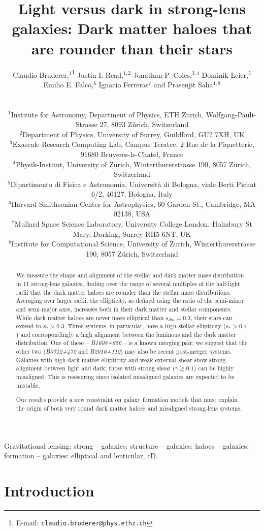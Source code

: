 \documentclass[useAMS,usenatbib]{mn2e}
\title[Light versus dark in strong-lens galaxies]{Light versus dark in strong-lens galaxies: Dark matter haloes that are rounder than their stars}
\author[Bruderer et al.]
{\parbox{\textwidth}{Claudio Bruderer,$^{1}$\thanks{E-mail: \texttt{claudio.bruderer@phys.ethz.ch}}
Justin I. Read,$^{1,2}$
Jonathan P. Coles,$^{3,4}$
Dominik Leier,$^{5}$
Emilio E. Falco,$^{6}$
Ignacio Ferreras$^{7}$ and
Prasenjit Saha$^{4,8}$}\vspace{0.4cm}\\
\parbox{\textwidth}{$^{1}$Institute for Astronomy, Department of Physics, ETH Zurich, Wolfgang-Pauli-Strasse 27, 8093 Z\"urich, Switzerland\\
$^{2}$Department of Physics, University of Surrey, Guildford, GU2 7XH, UK\\
$^{3}$Exascale Research Computing Lab, Campus Teratec, 2 Rue de la Piquetterie, 91680 Bruyeres-le-Chatel, France\\
$^{4}$Physik-Institut, University of Zurich, Winterthurerstrasse 190, 8057 Z\"urich, Switzerland\\
$^{5}$Dipartimento di Fisica e Astronomia, Universit\`{a} di Bologna, viale Berti Pichat 6/2, 40127, Bologna, Italy\\
$^{6}$Harvard-Smithsonian Center for Astrophysics, 60 Garden St., Cambridge, MA 02138, USA\\
$^{7}$Mullard Space Science Laboratory, University College London, Holmbury St Mary, Dorking, Surrey RH5 6NT, UK\\
$^{8}$Institute for Computational Science, University of Zurich, Winterthurerstrasse 190, 8057 Z\"urich, Switzerland}}
\begin{document}
\maketitle

\begin{abstract}
We measure the shape and alignment of the stellar and dark matter mass distribution in 11 strong-lens galaxies, finding over the range of several multiples of the half-light radii that the dark matter haloes are rounder than the stellar mass distributions. Averaging over larger radii, the ellipticity, as defined using the ratio of the semi-minor and semi-major axes, increases both in their dark matter and stellar components. While dark matter haloes are never more elliptical than $s_{dm} = 0.3$, their stars can extend to $s_* > 0.3$. Three systems, in particular, have a high stellar ellipticity ($s_* > 0.4$) and correspondingly a high alignment between the luminous and the dark matter distribution. One of these -- {\it B1608+656} -- is a known merging pair; we suggest that the other two ({\it B0712+472} and {\it B2016+112}) may also be recent post-merger systems. Galaxies with high dark matter ellipticity and weak external shear show strong alignment between light and dark; those with strong shear ($\gamma \gtrsim 0.1$) can be highly misaligned. This is reassuring since isolated misaligned galaxies are expected to be unstable.

Our results provide a new constraint on galaxy formation models that must explain the origin of both very round dark matter haloes and misaligned strong-lens systems.
\end{abstract}

\begin{keywords}
Gravitational lensing: strong -- galaxies: structure -- galaxies: haloes -- galaxies: formation -- galaxies: elliptical and lenticular, cD.
\end{keywords}


\section{Introduction}\label{sec:introduction}
\end{document}
